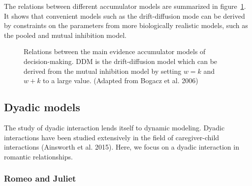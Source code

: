 \documentclass[
  a4paper,
  DIV=11,
  numbers=noendperiod,
  oneside]{scrreprt}
\begin{document}
The relations between different accumulator models are summarized in
figure~\ref{fig-ch4n-img8-old-56}. It shows that convenient models such
as the drift-diffusion mode can be derived by constraints on the
parameters from more biologically realistic models, such as the pooled
and mutual inhibition model.

\begin{figure}


\caption{\label{fig-ch4n-img8-old-56}Relations between the main evidence
accumulator models of decision-making. DDM is the drift-diffusion model
which can be derived from the mutual inhibition model by setting
\(w = k\) and \(w + k\) to a large value. (Adapted from Bogacz et al.
2006)}

\end{figure}%

\subsection{Dyadic models}\label{sec-Dyadic-models}

The study of dyadic interaction lends itself to dynamic modeling. Dyadic
interactions have been studied extensively in the field of
caregiver-child interactions (Ainsworth et al. 2015). Here, we focus on
a dyadic interaction in romantic relationships.

\subsubsection{Romeo and Juliet}\label{sec-Romeo-and-Juliet}
\end{document}
